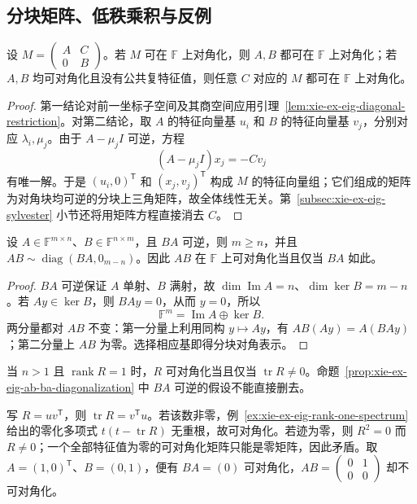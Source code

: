 \subsection{分块矩阵、低秩乘积与反例}

\begin{proposition}
\label{prop:xie-ex-eig-block-diagonalization}
设 $M=\begin{pmatrix}A&C\\0&B\end{pmatrix}$。若 $M$ 可在 $\mathbb F$ 上对角化，则 $A,B$ 都可在 $\mathbb F$ 上对角化；若 $A,B$ 均可对角化且没有公共复特征值，则任意 $C$ 对应的 $M$ 都可在 $\mathbb F$ 上对角化。
\end{proposition}
\begin{proof}
第一结论对前一坐标子空间及其商空间应用引理~\ref{lem:xie-ex-eig-diagonal-restriction}。对第二结论，取 $A$ 的特征向量基 $u_i$ 和 $B$ 的特征向量基 $v_j$，分别对应 $\lambda_i,\mu_j$。由于 $A-\mu_jI$ 可逆，方程
\[
(A-\mu_jI)x_j=-Cv_j
\]
有唯一解。于是 $(u_i,0)^{\mathsf T}$ 和 $(x_j,v_j)^{\mathsf T}$ 构成 $M$ 的特征向量组；它们组成的矩阵为对角块均可逆的分块上三角矩阵，故全体线性无关。第~\ref{subsec:xie-ex-eig-sylvester} 小节还将用矩阵方程直接消去 $C$。
\end{proof}

\begin{proposition}
\label{prop:xie-ex-eig-ab-ba-diagonalization}
设 $A\in\mathbb F^{m\times n}$、$B\in\mathbb F^{n\times m}$，且 $BA$ 可逆，则 $m\ge n$，并且 $AB\sim\operatorname{diag}(BA,0_{m-n})$。因此 $AB$ 在 $\mathbb F$ 上可对角化当且仅当 $BA$ 如此。
\end{proposition}
\begin{proof}
$BA$ 可逆保证 $A$ 单射、$B$ 满射，故 $\dim\operatorname{Im}A=n$、$\dim\ker B=m-n$。若 $Ay\in\ker B$，则 $BAy=0$，从而 $y=0$，所以
\[
\mathbb F^m=\operatorname{Im}A\oplus\ker B.
\]
两分量都对 $AB$ 不变：第一分量上利用同构 $y\mapsto Ay$，有 $AB(Ay)=A(BAy)$；第二分量上 $AB$ 为零。选择相应基即得分块对角表示。
\end{proof}

\begin{example}
\label{ex:xie-ex-eig-rank-one-diagonalization}
当 $n>1$ 且 $\operatorname{rank}R=1$ 时，$R$ 可对角化当且仅当 $\operatorname{tr}R\ne0$。命题~\ref{prop:xie-ex-eig-ab-ba-diagonalization} 中 $BA$ 可逆的假设不能直接删去。
\end{example}
\begin{solve}
写 $R=uv^{\mathsf T}$，则 $\operatorname{tr}R=v^{\mathsf T}u$。若该数非零，例~\ref{ex:xie-ex-eig-rank-one-spectrum} 给出的零化多项式 $t(t-\operatorname{tr}R)$ 无重根，故可对角化。若迹为零，则 $R^2=0$ 而 $R\ne0$；一个全部特征值为零的可对角化矩阵只能是零矩阵，因此矛盾。取 $A=(1,0)^{\mathsf T}$、$B=(0,1)$，便有 $BA=(0)$ 可对角化，$AB=\begin{pmatrix}0&1\\0&0\end{pmatrix}$ 却不可对角化。
\end{solve}

